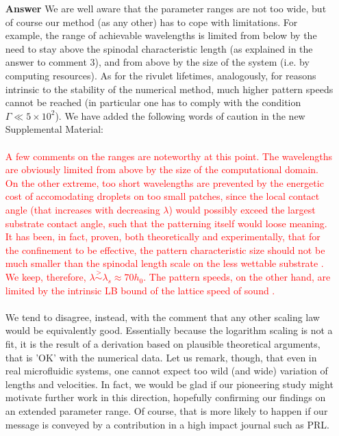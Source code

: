 \documentclass[12pt,english]{article}
\begin{document}
\begin{itemize}
\item[ \textbf{{Answer}}]
{ 
We are well aware that the parameter ranges are not too wide, but 
of course our method (as any other) has to cope with limitations. 
For example, the range of achievable wavelengths is limited from below 
by the need to stay above the spinodal characteristic length (as explained in the answer to comment 3), and from above by the size of the system (i.e. by computing resources). As for the rivulet lifetimes, analogously, for reasons intrinsic to the stability of the numerical method, much higher pattern speeds cannot be reached 
(in particular one has to comply with the condition $\Gamma \ll 5 \times 10^2$). We have added the following
words of caution in the new Supplemental Material:\\
\\
\textcolor{red}{A few comments on the ranges are noteworthy at this point. The wavelengths are obviously limited from above by the size of the computational domain. On the other extreme, too short wavelengths are prevented by
the energetic cost of accomodating droplets on too
small patches, since the local contact angle (that increases with decreasing $\lambda$) would possibly exceed the largest substrate contact angle, such that the patterning 
itself would loose meaning. 
It has been, in fact, proven, both theoretically and experimentally, that 
for the confinement to be effective, the pattern characteristic size should 
not be much smaller than the spinodal length scale on the less wettable substrate
\cite{KarguptaJCP2002,KarguptaLangmuir2000,Nisato1999,Karim1998}.
We keep, therefore, $\lambda \stackrel{>}{\sim} \lambda_s \approx 70 h_0$. 
The pattern speeds, on the other hand, are limited by the intrinsic LB bound of the lattice speed of sound
 \cite{succi}.}\\
\\
We tend to disagree, instead, with the comment that any other scaling 
law would be equivalently good. Essentially because the logarithm scaling is 
not a fit, it is the result of a derivation based on plausible theoretical arguments, that 
is 'OK' with the numerical data.
Let us remark, though, that even in real microfluidic systems, 
one cannot expect too wild (and wide) variation of lengths and velocities.
In fact, we would be glad if our pioneering study might motivate further work 
in this direction, hopefully confirming our findings on an extended parameter 
range. Of course, that is more likely to happen if our message is conveyed
by a contribution in a high impact journal such as PRL. 
}

\end{itemize}



\end{document}
